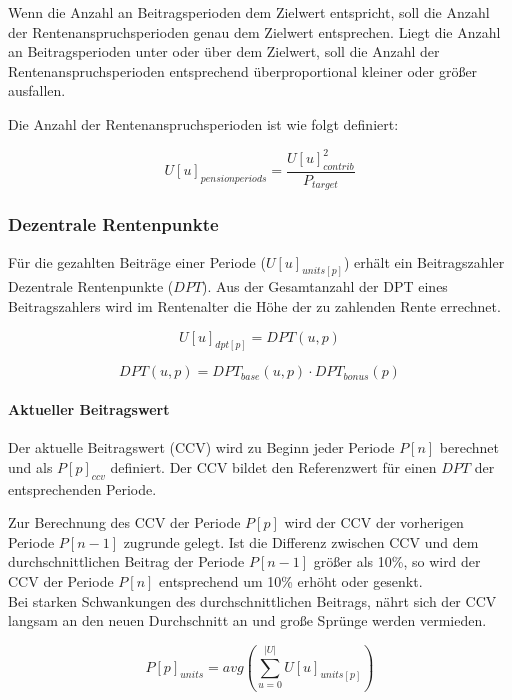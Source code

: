 Wenn die Anzahl an Beitragsperioden dem Zielwert entspricht, soll die Anzahl der 
Rentenanspruchsperioden genau dem Zielwert entsprechen. Liegt die  Anzahl an
Beitragsperioden unter oder über dem Zielwert, soll die Anzahl der 
Rentenanspruchsperioden entsprechend überproportional kleiner oder größer ausfallen.  

Die Anzahl der Rentenanspruchsperioden ist wie folgt definiert:

\begin{equation}
U[u]_{pensionperiods} = \frac{U[u]_{contrib}^2}{P_{target}}
\end{equation}


\subsubsection{Dezentrale Rentenpunkte}
Für die gezahlten Beiträge einer Periode ($U[u]_{units[p]}$) erhält ein Beitragszahler Dezentrale Rentenpunkte
($DPT$). Aus der Gesamtanzahl der DPT eines Beitragszahlers wird im Rentenalter
die Höhe der zu zahlenden Rente errechnet.

\begin{equation}
U[u]_{dpt[p]} = DPT(u, p)
\end{equation}

\begin{equation}
DPT(u, p) = DPT_{base}(u, p) \cdot DPT_{bonus}(p)
\end{equation}

\paragraph*{Aktueller Beitragswert}
Der aktuelle Beitragswert (CCV) wird zu Beginn jeder Periode 
$P[n]$ berechnet und als $P[p]_{ccv}$ definiert. Der CCV bildet den Referenzwert für einen $DPT$ der
entsprechenden Periode.

Zur Berechnung des CCV der Periode $P[p]$ wird der CCV der vorherigen
Periode $P[n-1]$ zugrunde gelegt. Ist die Differenz zwischen CCV und dem
durchschnittlichen Beitrag der Periode $P[n-1]$ größer als 10\%, so wird
der CCV der Periode $P[n]$ entsprechend um 10\% erhöht oder gesenkt.\\
Bei starken Schwankungen des durchschnittlichen Beitrags, nährt sich der CCV langsam an den neuen Durchschnitt an und große Sprünge werden vermieden.


\begin{equation}
P[p]_{units} = avg(\sum_{u=0}^{|U|} U[u]_{units[p]})
\end{equation}

